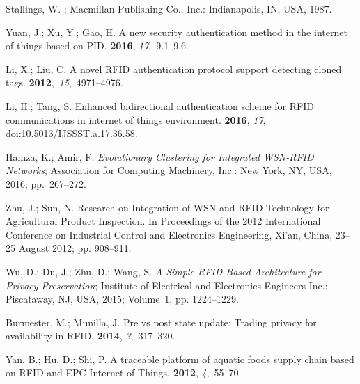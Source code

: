 \documentclass[symmetry,article,accept,moreauthors,pdftex10pt,a4paper]{mdpi}
\begin{document}
\begin{thebibliography}{999}
Stallings, W.
; Macmillan
Publishing Co., Inc.: Indianapolis, IN, USA, 1987.

Yuan, J.; Xu, Y.; Gao, H.
\newblock A new security authentication method in the internet of things based
on PID.
 {\bf 2016}, {\em 17},~9.1--9.6. 

Li, X.; Liu, C.
\newblock A novel RFID authentication protocol support detecting cloned tags.
 {\bf 2012},~{\em 15},~4971--4976.

Li, H.; Tang, S.
\newblock Enhanced bidirectional authentication scheme for RFID communications
in internet of things environment.
 {\bf 2016}, {\em 17}, doi:10.5013/IJSSST.a.17.36.58.

Hamza, K.; Amir, F.
\newblock \emph{Evolutionary Clustering for Integrated WSN-RFID Networks};
\newblock Association for Computing Machinery, Inc.: New York, NY, USA, 2016; pp.~267--272.

Zhu, J.; Sun, N.
\newblock Research on Integration of WSN and RFID Technology for Agricultural
Product Inspection.
\newblock In Proceedings of the 2012 International Conference on Industrial Control and Electronics
Engineering, Xi'an, China, 23--25 August 2012; pp. 908--911.

Wu, D.; Du, J.; Zhu, D.; Wang, S.
\newblock \emph{A Simple RFID-Based Architecture for Privacy Preservation};
\newblock Institute of Electrical and Electronics Engineers Inc.: Piscataway, NJ, USA, 2015;
Volume~1, pp. 1224--1229.

Burmester, M.; Munilla, J.
\newblock Pre vs post state update: Trading privacy for availability in RFID.
 {\bf 2014}, {\em
	3},~317--320.

Yan, B.; Hu, D.; Shi, P.
\newblock A traceable platform of aquatic foods supply chain based on RFID and
EPC Internet of Things.
 {\bf 2012}, {\em 4},~55--70.


\end{thebibliography}
\end{document}
